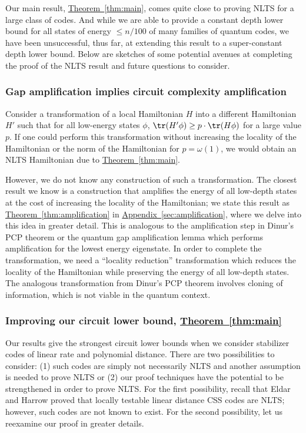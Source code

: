 \documentclass[11pt]{article}
\newcommand{\expref}[2]{\texorpdfstring{\hyperref[#2]{#1~\ref{#2}}}{#1~\ref{#2}}}
\begin{document}
Our main result, \expref{Theorem}{thm:main}, comes quite close to proving NLTS for a large class of codes. And while we are able to provide a constant depth lower bound for all states of energy $\leq n/100$ of many families of quantum codes, we have been unsuccessful, thus far, at extending this result to a super-constant depth lower bound. Below are sketches of some potential avenues at completing the proof of the NLTS result and future questions to consider.

\subsubsection{Gap amplification implies circuit complexity amplification}

\label{sec:openamplify}

Consider a transformation of a local Hamiltonian $H$ into a different Hamiltonian $H'$ such that for all low-energy states $\phi$, $\tr(H' \phi) \geq p \cdot \tr(H \phi)$ for a large value $p$. If one could perform this transformation without increasing the locality of the Hamiltonian or the norm of the Hamiltonian for $p = \omega(1)$, we would obtain an NLTS Hamiltonian due to \expref{Theorem}{thm:main}.  

However, we do not know any construction of such a transformation. The closest result we know is a construction that amplifies the energy of all low-depth states %
%
at the cost of increasing the locality of the Hamiltonian;  we state this result as \expref{Theorem}{thm:amplification} in \expref{Appendix}{sec:amplification}, where we delve into this idea in greater detail. This is analogous to the amplification step in Dinur's PCP theorem \cite{dinur-pcp} or the quantum gap amplification lemma \cite{10.1145/1536414.1536472} which performs amplification for the lowest energy eigenstate. In order to complete the transformation, we need a ``locality reduction'' transformation which reduces the locality of the Hamiltonian while preserving the energy of all low-depth states. The analogous transformation from Dinur's PCP theorem involves cloning of information, which is not viable in the quantum context.

\subsubsection{Improving our circuit lower bound, \expref{Theorem}{thm:main}}

Our results give the strongest circuit lower bounds when we consider stabilizer codes of linear rate and polynomial distance. There are two possibilities to consider: (1) such codes are simply not necessarily NLTS and another assumption is needed to prove NLTS or (2) our proof techniques have the potential to be strengthened in order to prove NLTS. For the first possibility, recall that Eldar and Harrow \cite{8104078} proved that
locally testable %
linear distance CSS codes are NLTS; however, such codes are not known to exist. For the second possibility, let us reexamine our proof in greater details. 
\end{document}
